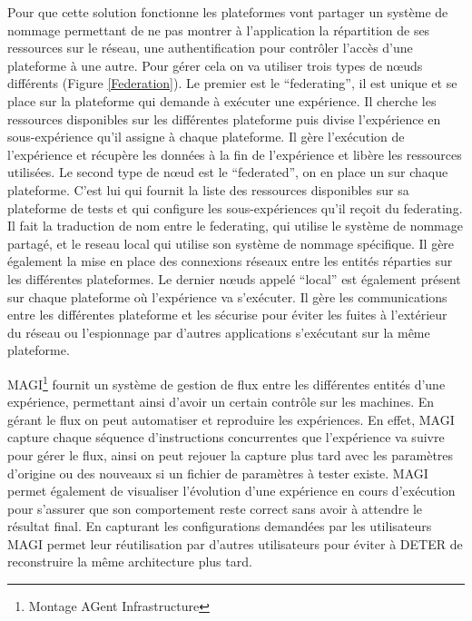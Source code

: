 Pour que cette solution fonctionne les plateformes vont partager un système de
nommage permettant de ne pas montrer à l'application la répartition de ses
ressources sur le réseau, une authentification pour contrôler l'accès d'une
plateforme à une autre. Pour gérer cela on va utiliser trois types de n\oe uds
différents (Figure \ref{Federation}). Le premier est le ``federating'', il est
unique et se place sur la plateforme qui demande à exécuter une expérience. Il
cherche les ressources disponibles sur les différentes plateforme puis divise
l'expérience en sous-expérience qu'il assigne à chaque plateforme. Il gère
l'exécution de l'expérience et récupère les données à la fin de l'expérience et
libère les ressources utilisées. Le second type de n\oe ud est le ``federated'',
on en place un sur chaque plateforme. C'est lui qui fournit la liste des
ressources disponibles sur sa plateforme de tests et qui configure les
sous-expériences qu'il reçoit du federating. Il fait la traduction de nom entre
le federating, qui utilise le système de nommage partagé, et le reseau local qui
utilise son système de nommage spécifique.  Il gère également la mise en place
des connexions réseaux entre les entités réparties sur les différentes
plateformes. Le dernier n\oe uds appelé ``local'' est également présent sur
chaque plateforme où l'expérience va s'exécuter. Il gère les communications
entre les différentes plateforme et les sécurise pour éviter les fuites à
l'extérieur du réseau ou l'espionnage par d'autres applications s'exécutant sur
la même plateforme.

MAGI\footnote{Montage AGent Infrastructure} fournit un système de
gestion de flux entre les différentes entités d'une expérience,
permettant ainsi d'avoir un certain contrôle sur les machines. En
gérant le flux on peut automatiser et reproduire les expériences. En
effet, MAGI capture chaque séquence d'instructions concurrentes que
l'expérience va suivre pour gérer le flux, ainsi on peut rejouer la
capture plus tard avec les paramètres d'origine ou des nouveaux si un
fichier de paramètres à tester existe. MAGI permet également de
visualiser l'évolution d'une expérience en cours d'exécution pour
s'assurer que son comportement reste correct sans avoir à attendre le
résultat final. En capturant les configurations demandées par les
utilisateurs MAGI permet leur réutilisation par d'autres utilisateurs
pour éviter à DETER de reconstruire la même architecture plus tard.


